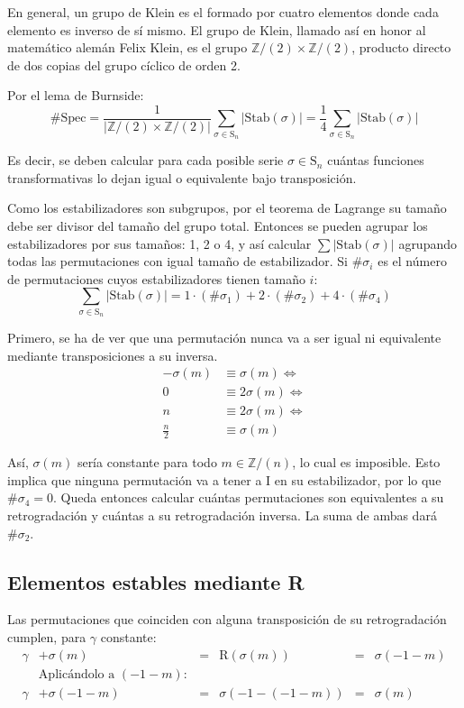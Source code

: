 		En general, un grupo de Klein es el formado por cuatro elementos donde cada elemento es inverso de sí mismo. El grupo de Klein, llamado así en honor al matemático alemán Felix Klein, es el grupo $\mathbb{Z}/(2)\times\mathbb{Z}/(2)$, producto directo de dos copias del grupo cíclico de orden 2.
		
		Por el lema de Burnside:	
		\[\#\text{Spec}=\frac{1}{|\mathbb{Z}/(2)\times\mathbb{Z}/(2)|}\sum_{\sigma\in\text{S}_n}|\text{Stab}(\sigma)|=\frac{1}{4}\sum_{\sigma\in\text{S}_n}|\text{Stab}(\sigma)|\]
		
		Es decir, se deben calcular para cada posible serie $\sigma\in\text{S}_n$ cuántas funciones transformativas lo dejan igual o equivalente bajo transposición.
		
		Como los estabilizadores son subgrupos, por el teorema de Lagrange su tamaño debe ser divisor del tamaño del grupo total. Entonces se pueden agrupar los estabilizadores por sus tamaños: 1, 2 o 4, y así calcular $\sum|\text{Stab}(\sigma)|$ agrupando todas las permutaciones con igual tamaño de estabilizador. Si $\#\sigma_i$ es el número de permutaciones cuyos estabilizadores tienen tamaño $i$:		
		\[\sum_{\sigma\in\text{S}_n}|\text{Stab}(\sigma)|=1\cdot(\#\sigma_1)+2\cdot(\#\sigma_2)+4\cdot(\#\sigma_4)\]
	
		Primero, se ha de ver que una permutación nunca va a ser igual ni equivalente mediante transposiciones a su inversa.	\label{inversano}
			\begin{align*}
			-\sigma(m)&\equiv\sigma(m)\Longleftrightarrow\\
			0&\equiv2\sigma(m)\Longleftrightarrow\\
			n&\equiv2\sigma(m)\Longleftrightarrow\\
			\frac{n}{2}&\equiv\sigma(m)
			\end{align*}
		
		Así, $\sigma(m)$ sería constante para todo $m\in \mathbb{Z} / (n)$, lo cual es imposible. Esto implica que ninguna permutación va a tener a I en su estabilizador, por lo que $\#\sigma_4=0$. Queda entonces calcular cuántas permutaciones son equivalentes a su retrogradación y cuántas a su retrogradación inversa. La suma de ambas dará $\#\sigma_2$.
	
	\subsection{Elementos estables mediante R}
		Las permutaciones que coinciden con alguna transposición de su retrogradación cumplen, para $\gamma$ constante:
		\begin{align*}
		\gamma&+\sigma(m) &=& \text{R}(\sigma(m)) &=& \sigma(-1-m)\\
		&\text{Aplicándolo a }(-1-m):\\
		\gamma&+\sigma(-1-m) &=& \sigma(-1-(-1-m)) &=& \sigma(m)
		\end{align*}
		
